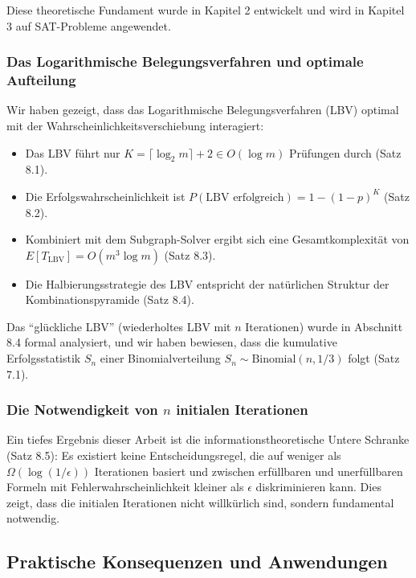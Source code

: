 ﻿\documentclass[a4paper,12pt]{article}
\theoremstyle{definition}
\begin{document}
Diese theoretische Fundament wurde in Kapitel 2 entwickelt und wird in Kapitel 3 auf SAT-Probleme angewendet.

\subsubsection{Das Logarithmische Belegungsverfahren und optimale Aufteilung}

Wir haben gezeigt, dass das Logarithmische Belegungsverfahren (LBV) optimal mit der Wahrscheinlichkeitsverschiebung interagiert:

\begin{itemize}
	\item Das LBV führt nur $K = \lceil \log_2 m \rceil + 2 \in O(\log m)$ Prüfungen durch (Satz 8.1).
	
	\item Die Erfolgswahrscheinlichkeit ist $P(\text{LBV erfolgreich}) = 1 - (1-p)^K$ (Satz 8.2).
	
	\item Kombiniert mit dem Subgraph-Solver ergibt sich eine Gesamtkomplexität von $E[T_{\text{LBV}}] = O(m^3 \log m)$ (Satz 8.3).
	
	\item Die Halbierungsstrategie des LBV entspricht der natürlichen Struktur der Kombinationspyramide (Satz 8.4).
\end{itemize}

Das ``glückliche LBV'' (wiederholtes LBV mit $n$ Iterationen) wurde in Abschnitt 8.4 formal analysiert, und wir haben bewiesen, dass die kumulative Erfolgsstatistik $S_n$ einer Binomialverteilung $S_n \sim \text{Binomial}(n, 1/3)$ folgt (Satz 7.1).

\subsubsection{Die Notwendigkeit von $n$ initialen Iterationen}

Ein tiefes Ergebnis dieser Arbeit ist die informationstheoretische Untere Schranke (Satz 8.5): Es existiert keine Entscheidungsregel, die auf weniger als $\Omega(\log(1/\epsilon))$ Iterationen basiert und zwischen erfüllbaren und unerfüllbaren Formeln mit Fehlerwahrscheinlichkeit kleiner als $\epsilon$ diskriminieren kann. Dies zeigt, dass die initialen Iterationen nicht willkürlich sind, sondern fundamental notwendig.

\subsection{Praktische Konsequenzen und Anwendungen}
\end{document}
